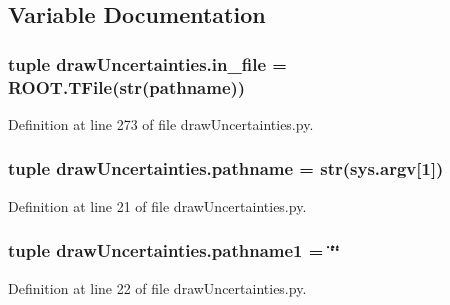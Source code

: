 \subsection{Variable Documentation}
\hypertarget{namespacedraw_uncertainties_ab8c6ba7f1f9b613593d7766761fc1f59}{
\subsubsection[{in\-\_\-file}]{\setlength{\rightskip}{0pt plus 5cm}tuple draw\-Uncertainties.\-in\-\_\-file = R\-O\-O\-T.\-T\-File(str({\bf pathname}))}}\label{namespacedraw_uncertainties_ab8c6ba7f1f9b613593d7766761fc1f59}


Definition at line 273 of file draw\-Uncertainties.\-py.

\hypertarget{namespacedraw_uncertainties_a50e3d2dc06f1d99f2bd8e5e6d1154884}{
\subsubsection[{pathname}]{\setlength{\rightskip}{0pt plus 5cm}tuple draw\-Uncertainties.\-pathname = str(sys.\-argv\mbox{[}1\mbox{]})}}\label{namespacedraw_uncertainties_a50e3d2dc06f1d99f2bd8e5e6d1154884}


Definition at line 21 of file draw\-Uncertainties.\-py.

\hypertarget{namespacedraw_uncertainties_aef917564a3adce487822fc487ef606df}{
\subsubsection[{pathname1}]{\setlength{\rightskip}{0pt plus 5cm}tuple draw\-Uncertainties.\-pathname1 = \char`\"{}\char`\"{}}}\label{namespacedraw_uncertainties_aef917564a3adce487822fc487ef606df}


Definition at line 22 of file draw\-Uncertainties.\-py.

